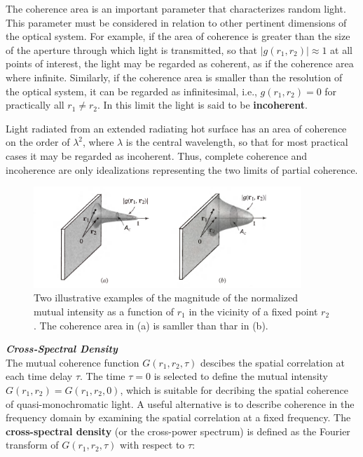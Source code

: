 \documentclass{article}
\numberwithin{figure}{subsection}
\numberwithin{table}{subsection}
\begin{document}
\par The coherence area is an important parameter that characterizes random light. This parameter must be considered in relation to other pertinent dimensions of the optical system. For example, if the area of coherence is greater than the size of the aperture through which light is transmitted, so that $ \lvert g(r_1, r_2) \rvert \approx 1 $ at all points of interest, the light may be regarded as coherent, as if the coherence area where infinite. Similarly, if the coherence area is smaller than the resolution of the optical system, it can be regarded as infinitesimal, i.e., $ g(r_1, r_2) = 0 $ for practically all $ r_1 \neq r_2 $. In this limit the light is said to be \textbf{incoherent}.
\par Light radiated from an extended radiating hot surface has an area of coherence on the order of $ \lambda^2 $, where $ \lambda $ is the central wavelength, so that for most practical cases it may be regarded as incoherent. Thus, complete coherence and incoherence are only idealizations representing the two limits of partial coherence.
 \begin{figure}[H]
\centering
\includegraphics[width=0.9\textwidth]{11_1_8.PNG}
\caption{Two illustrative examples of the magnitude of the normalized mutual intensity as a function of $ r_1 $ in the vicinity of a fixed point $ r_2 $. The coherence area in (a) is samller than thar in (b).}
\label{fig: 11_1_8}
\end{figure}
\bigbreak\noindent\textcolor{ksc}{\textbf{\textsl{Cross-Spectral Density}}}\\
The mutual coherence function $ G(r_1, r_2, \tau) $ descibes the spatial correlation at each time delay $ \tau $. The time $ \tau = 0 $ is selected to define the mutual intensity $ G(r_1, r_2) = G(r_1, r_2, 0) $, which is suitable for decribing the spatial coherence of quasi-monochromatic light. A useful alternative is to describe coherence in the frequency domain by examining the spatial correlation at a fixed frequency. The \textbf{cross-spectral density} (or the cross-power spectrum) is defined as the Fourier transform of $ G(r_1, r_2, \tau) $ with respect to $ \tau $:
\end{document}
